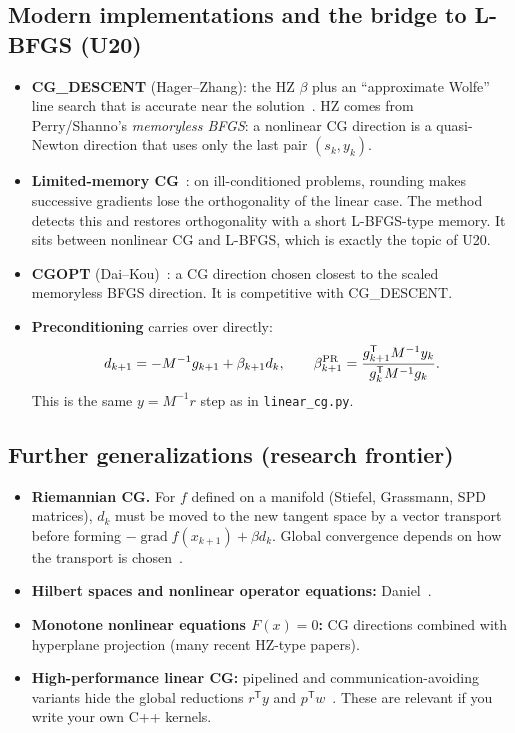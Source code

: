 \documentclass[11pt,a4paper]{article}
\theoremstyle{remark}
\newcommand{\ip}[2]{#1^{\mathsf T}#2}
\begin{document}
\subsection{Modern implementations and the bridge to L-BFGS (U20)}
\begin{itemize}[leftmargin=1.5em]
\item \textbf{CG\_DESCENT} (Hager--Zhang): the HZ $\beta$ plus an ``approximate Wolfe'' line search that is accurate near the solution~\cite{HagerZhang2005}. HZ comes from Perry/Shanno's \emph{memoryless BFGS}: a nonlinear CG direction is a quasi-Newton direction that uses only the last pair $(s_k,y_k)$.
\item \textbf{Limited-memory CG}~\cite{HagerZhang2013}: on ill-conditioned problems, rounding makes successive gradients lose the orthogonality of the linear case. The method detects this and restores orthogonality with a short L-BFGS-type memory. It sits between nonlinear CG and L-BFGS, which is exactly the topic of U20.
\item \textbf{CGOPT} (Dai--Kou)~\cite{DaiKou2013}: a CG direction chosen closest to the scaled memoryless BFGS direction. It is competitive with CG\_DESCENT.
\item \textbf{Preconditioning} carries over directly:
\[
d_{k+1}=-M^{-1}g_{k+1}+\beta_{k+1}d_k,\qquad \beta^{\rm PR}_{k+1}=\frac{\ip{g_{k+1}}{M^{-1}y_k}}{\ip{g_k}{M^{-1}g_k}}.
\] This is the same $y=M^{-1}r$ step as in \texttt{linear\_cg.py}.
\end{itemize}

\subsection{Further generalizations (research frontier)}
\begin{itemize}[leftmargin=1.5em]
\item \textbf{Riemannian CG.} For $f$ defined on a manifold (Stiefel, Grassmann, SPD matrices), $d_k$ must be moved to the new tangent space by a vector transport before forming $-\operatorname{grad}f(x_{k+1})+\beta d_k$. Global convergence depends on how the transport is chosen~\cite{RingWirth2012,SatoIwai2015,Sato2022}.
\item \textbf{Hilbert spaces and nonlinear operator equations:} Daniel~\cite{Daniel1967}.
\item \textbf{Monotone nonlinear equations $F(x)=0$:} CG directions combined with hyperplane projection (many recent HZ-type papers).
\item \textbf{High-performance linear CG:} pipelined and communication-avoiding variants hide the global reductions $\ip{r}{y}$ and $\ip{p}{w}$~\cite{GhyselsVanroose2014}. These are relevant if you write your own C++ kernels.
\end{itemize}
\end{document}
